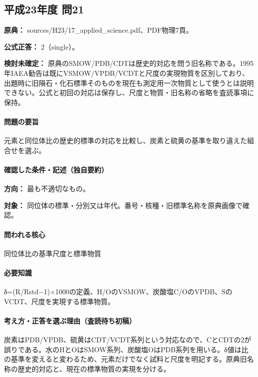 \subsection{平成23年度 問21}
\label{q:h23-reg-applied-21}

\noindent\textbf{原典：} sources/H23/17\_applied\_science.pdf、PDF物理7頁。

\textbf{公式正答：} 2（single）。

\par\textbf{検討未確定：} 原典のSMOW/PDB/CDTは歴史的対応を問う旧名称である。1995年IAEA勧告は既にVSMOW/VPDB/VCDTと尺度の実現物質を区別しており、出題時に旧隕石・化石標準そのものを現在も測定用一次物質として使うとは説明できない。公式と初回の対応は保存し、尺度と物質・旧名称の省略を査読事項に保持。

\paragraph{問題の要旨} 元素と同位体比の歴史的標準の対応を比較し、炭素と硫黄の基準を取り違えた組合せを選ぶ。

\paragraph{確認した条件・記述（独自要約）}\mbox{}\par

\noindent\textbf{方向：} 最も不適切なもの。\par

\noindent\textbf{対象：} 同位体の標準・分別又は年代。番号・核種・旧標準名称を原典画像で確認。\par

\paragraph{問われる核心} 同位体比の基準尺度と標準物質

\paragraph{必要知識} δ=(R/Rstd−1)×1000の定義、H/OのVSMOW、炭酸塩C/OのVPDB、SのVCDT、尺度を実現する標準物質。

\paragraph{考え方・正答を選ぶ理由（査読待ち初稿）} 炭素はPDB/VPDB、硫黄はCDT/VCDT系列という対応なので、CとCDTの2が誤りである。水のHとOはSMOW系列、炭酸塩OはPDB系列を用いる。δ値は比の基準を変えると変わるため、元素だけでなく試料と尺度を明記する。原典旧名称の歴史的対応と、現在の標準物質の実現を分ける。


